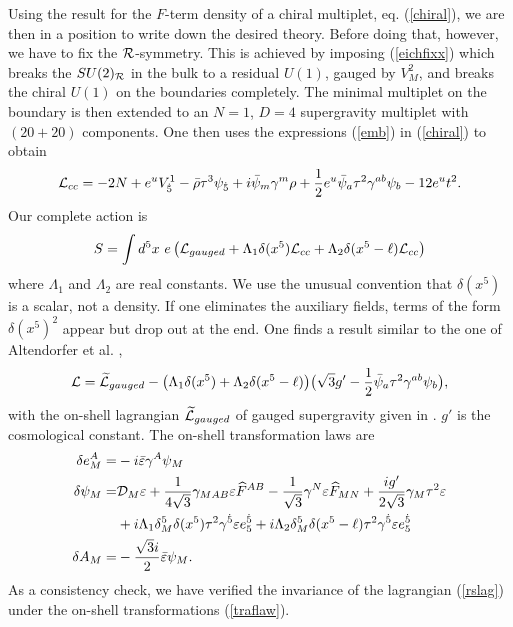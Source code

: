 \documentclass[a4paper,12pt, twoside]{article}
\numberwithin{equation}{section}
\begin{document}
Using the result for the $F$-term density of a chiral multiplet, eq. 
(\ref{chiral}), we are then in a position to write down the desired 
theory. Before doing that, however, we have to fix the $\cal R$-symmetry. 
This is achieved by imposing (\ref{eichfixx}) which breaks the 
$SU(2)_{\cal R}$ in the bulk to a residual $U(1)$, gauged by $V_M^2$, and breaks 
the chiral $U(1)$ on the boundaries completely. The minimal multiplet 
on the boundary is then extended to an $N=1$, $D=4$ supergravity 
multiplet with $(20+20)$ components. One then uses the expressions (\ref{emb}) 
in (\ref{chiral}) to obtain
\begin{equation}
{\cal L}_{cc}=-2N + e^u  V_{\dot 5}^1 - \bar{\rho}\tau^3\psi_{\dot 
5}+i\bar{\psi}_m\gamma^m\rho+\frac{1}{2}e^u 
\bar{\psi}_a\tau^2\gamma^{ab}\psi_b - 12 e^u t^2.\label{dM}
\end{equation}
Our complete action is
\begin{equation}
S=\int d^5x~e\left( {\cal L}_{gauged} + \Lambda_1\delta(x^5){\cal 
L}_{cc}+\Lambda_2\delta(x^5-\ell){\cal L}_{cc}\right)\label{rs2}
\end{equation}
where $\Lambda_1$ and $\Lambda_2$ are real constants. We use the 
unusual convention that $\delta(x^5)$ is a scalar, not a density. If one 
eliminates the auxiliary fields, terms of the form $\delta(x^5)^2$ appear 
but drop out at the end. One finds a result similar to the one of 
Altendorfer et al. \cite{Altendorfer:2000rr},
\begin{equation}
{\cal L}=\widetilde{\cal L}_{gauged}- 
\big(\Lambda_1\delta(x^5)+\Lambda_2\delta(x^5-\ell)\big)\big( 
\sqrt{3}g'-\frac{1}{2}\bar{\psi}_a\tau^2\gamma^{ab}\psi_b\big),\label{rslag}
\end{equation}
with the on-shell lagrangian $\widetilde{\cal L}_{gauged}$ of gauged 
supergravity given in \cite{Zucker:1999fn}. $g'$ is the cosmological 
constant.
The on-shell transformation laws are
\begin{equation}
\begin{split}
\delta e_M^A = & - i\bar{\varepsilon}\gamma^A\psi_M\\
\delta \psi_M = &  {\cal D}_M \varepsilon 
+\frac{1}{4\sqrt{3}}\gamma_{MAB}\varepsilon\widehat{F}^{AB}-\frac{1}{\sqrt{3}}\gamma^N\varepsilon\widehat{F}_{MN}+\frac{ig'}{2\sqrt{3}}\gamma_M\tau^2\varepsilon\\
& + i\Lambda_1\delta_M^5\delta(x^5)\tau^2\gamma^{\dot{5}}\varepsilon 
e_5^{\dot{5}}+i\Lambda_2\delta_M^5\delta(x^5-\ell)\tau^2\gamma^{\dot{5}}\varepsilon 
e_5^{\dot{5}}\\
\delta A_M  = &  -  \frac{\sqrt{3}i}{2}\bar{\varepsilon}\psi_M.
\end{split}\label{traflaw}
\end{equation}
As a consistency check, we have verified the invariance of the 
lagrangian (\ref{rslag}) under the on-shell transformations (\ref{traflaw}).
\end{document}
